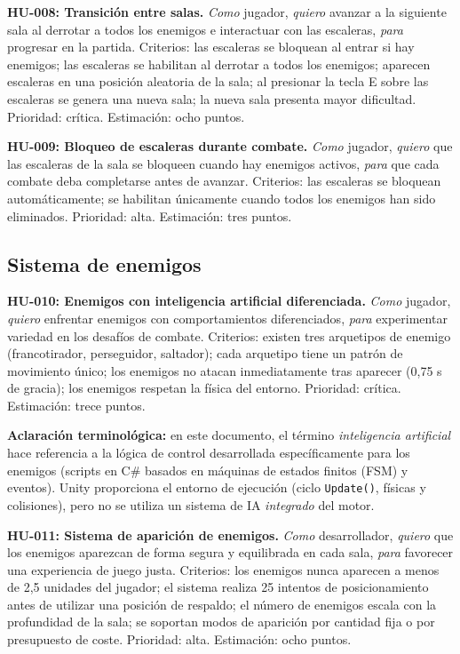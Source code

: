 \textbf{HU-008: Transición entre salas.}
\textit{Como} jugador, \textit{quiero} avanzar a la siguiente sala al derrotar a todos los enemigos e interactuar con las escaleras, \textit{para} progresar en la partida. Criterios: las escaleras se bloquean al entrar si hay enemigos; las escaleras se habilitan al derrotar a todos los enemigos; aparecen escaleras en una posición aleatoria de la sala; al presionar la tecla E sobre las escaleras se genera una nueva sala; la nueva sala presenta mayor dificultad. Prioridad: crítica. Estimación: ocho puntos.

\textbf{HU-009: Bloqueo de escaleras durante combate.}
\textit{Como} jugador, \textit{quiero} que las escaleras de la sala se bloqueen cuando hay enemigos activos, \textit{para} que cada combate deba completarse antes de avanzar. Criterios: las escaleras se bloquean automáticamente; se habilitan únicamente cuando todos los enemigos han sido eliminados. Prioridad: alta. Estimación: tres puntos.

\subsection{Sistema de enemigos}


\textbf{HU-010: Enemigos con inteligencia artificial diferenciada.}
\textit{Como} jugador, \textit{quiero} enfrentar enemigos con comportamientos diferenciados, \textit{para} experimentar variedad en los desafíos de combate. Criterios: existen tres arquetipos de enemigo (francotirador, perseguidor, saltador); cada arquetipo tiene un patrón de movimiento único; los enemigos no atacan inmediatamente tras aparecer (0,75 s de gracia); los enemigos respetan la física del entorno. Prioridad: crítica. Estimación: trece puntos.

\textbf{Aclaración terminológica:} en este documento, el término \textit{inteligencia artificial} hace referencia a la lógica de control desarrollada específicamente para los enemigos (scripts en C\# basados en máquinas de estados finitos (FSM) y eventos). Unity proporciona el entorno de ejecución (ciclo \texttt{Update()}, físicas y colisiones), pero no se utiliza un sistema de IA \textit{integrado} del motor.

\textbf{HU-011: Sistema de aparición de enemigos.}
\textit{Como} desarrollador, \textit{quiero} que los enemigos aparezcan de forma segura y equilibrada en cada sala, \textit{para} favorecer una experiencia de juego justa. Criterios: los enemigos nunca aparecen a menos de 2,5 unidades del jugador; el sistema realiza 25 intentos de posicionamiento antes de utilizar una posición de respaldo; el número de enemigos escala con la profundidad de la sala; se soportan modos de aparición por cantidad fija o por presupuesto de coste. Prioridad: alta. Estimación: ocho puntos.

